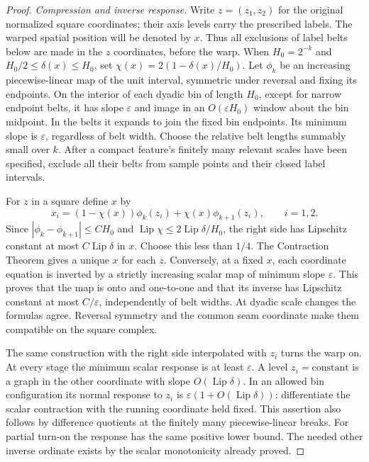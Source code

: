 \documentclass[11pt]{article}
\numberwithin{equation}{section}
\theoremstyle{definition}
\theoremstyle{remark}
\begin{document}
\begin{proof}
\emph{Compression and inverse response.}
Write $z=(z_1,z_2)$ for the original normalized square coordinates;
their axis levels carry the prescribed labels.  The warped spatial
position will be denoted by $x$.  Thus all exclusions of label belts
below are made in the $z$ coordinates, before the warp.
When $H_0=2^{-k}$ and $H_0/2\le\delta(x)\le H_0$, set
$\chi(x)=2(1-\delta(x)/H_0)$.  Let $\phi_k$ be an increasing
piecewise-linear map of the unit interval, symmetric under reversal
and fixing its endpoints.  On the interior of each dyadic bin of
length $H_0$, except for narrow endpoint belts, it has slope
$\varepsilon$ and image in an $O(\varepsilon H_0)$ window about the
bin midpoint.  In the belts it expands to join the fixed bin
endpoints.  Its minimum slope is $\varepsilon$, regardless of belt
width.  Choose the relative belt lengths summably small over $k$.
After a compact feature's finitely many relevant scales have been
specified, exclude all their belts from sample points and their
closed label intervals.

For $z$ in a square define $x$ by
\begin{equation}
 x_i=(1-\chi(x))\phi_k(z_i)+\chi(x)\phi_{k+1}(z_i),
 \qquad i=1,2.
 \label{ms:warp}
\end{equation}
Since $|\phi_k-\phi_{k+1}|\le C H_0$ and
$\operatorname{Lip}\chi\le 2\operatorname{Lip}\delta/H_0$, the right side has Lipschitz
constant at most $C\operatorname{Lip}\delta$ in $x$.  Choose this less than $1/4$.
The Contraction Theorem gives a unique $x$ for each $z$.  Conversely,
at a fixed $x$, each coordinate equation is inverted by a strictly
increasing scalar map of minimum slope $\varepsilon$.  This proves
that the map is onto and one-to-one and that its inverse has Lipschitz
constant at most $C/\varepsilon$, independently of belt widths.
At dyadic scale changes the formulas agree.  Reversal symmetry and
the common seam coordinate make them compatible on the square
complex.

The same construction with the right side interpolated with $z_i$
turns the warp on.  At every stage the minimum scalar response is
at least $\varepsilon$.  A level $z_i=\text{constant}$ is a graph in
the other coordinate with slope $O(\operatorname{Lip}\delta)$.  In an allowed bin
configuration its normal response to $z_i$ is
$\varepsilon(1+O(\operatorname{Lip}\delta))$: differentiate the scalar contraction
with the running coordinate held fixed.  This assertion also follows
by difference quotients at the finitely many piecewise-linear breaks.
For partial turn-on the response has the same positive lower bound.
The needed other inverse ordinate exists by the scalar monotonicity
already proved.


\end{proof}
\end{document}
